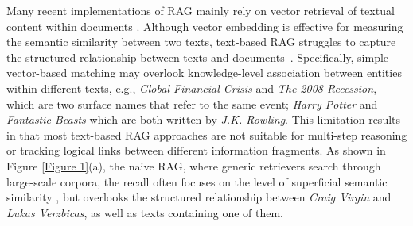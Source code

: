 \documentclass{article} %
\begin{document}
Many recent implementations of RAG mainly rely on vector retrieval of textual content within documents \citep{ding2024survey, asai2023selfraglearningretrievegenerate,wang2023learningfiltercontextretrievalaugmented}. 
Although vector embedding is effective for measuring the semantic similarity between two texts, text-based RAG struggles to capture the structured relationship between texts and documents~\citep{chen2023benchmarkinglargelanguagemodels}. Specifically, simple vector-based matching may overlook knowledge-level association between entities within different texts, e.g., \textit{Global Financial Crisis} and \textit{The 2008 Recession}, which are two surface names that refer to the same event; \textit{Harry Potter} and \textit{Fantastic Beasts} which are both written by \textit{J.K. Rowling}. This limitation results in that most text-based RAG approaches are not suitable for multi-step reasoning or tracking logical links between different information fragments. As shown in Figure \ref{Figure 1}(a), the naive RAG, where generic retrievers search through large-scale corpora, the recall often focuses on the level of superficial semantic similarity \citep{edge2024localglobalgraphrag}, but overlooks the structured relationship between \textit{Craig Virgin} and \textit{Lukas Verzbicas}, as well as texts containing one of them. 
\end{document}
